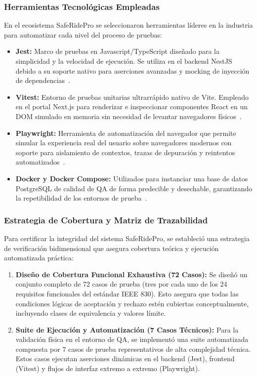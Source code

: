 \documentclass{article}
\begin{document}
\subsubsection*{Herramientas Tecnológicas Empleadas}
En el ecosistema SafeRidePro se seleccionaron herramientas líderes en la industria para automatizar cada nivel del proceso de pruebas:
\begin{itemize}
    \item \textbf{Jest:} Marco de pruebas en Javascript/TypeScript diseñado para la simplicidad y la velocidad de ejecución. Se utiliza en el backend NestJS debido a su soporte nativo para aserciones avanzadas y mocking de inyección de dependencias~\cite{jestdocs}.
    \item \textbf{Vitest:} Entorno de pruebas unitarias ultrarrápido nativo de Vite. Empleado en el portal Next.js para renderizar e inspeccionar componentes React en un DOM simulado en memoria sin necesidad de levantar navegadores físicos~\cite{vitestdocs}.
    \item \textbf{Playwright:} Herramienta de automatización del navegador que permite simular la experiencia real del usuario sobre navegadores modernos con soporte para aislamiento de contextos, trazas de depuración y reintentos automatizados~\cite{playwrightdocs}.
    \item \textbf{Docker y Docker Compose:} Utilizados para instanciar una base de datos PostgreSQL de calidad de QA de forma predecible y desechable, garantizando la repetibilidad de los entornos de prueba~\cite{dockerdocs}.
\end{itemize}

\subsubsection{Estrategia de Cobertura y Matriz de Trazabilidad}

Para certificar la integridad del sistema SafeRidePro, se estableció una estrategia de verificación bidimensional que asegura cobertura teórica y ejecución automatizada práctica:
\begin{enumerate}
    \item \textbf{Diseño de Cobertura Funcional Exhaustiva (72 Casos):} Se diseñó un conjunto completo de 72 casos de prueba (tres por cada uno de los 24 requisitos funcionales del estándar IEEE 830). Esto asegura que todas las condiciones lógicas de aceptación y rechazo estén cubiertas conceptualmente, incluyendo clases de equivalencia y valores límite.
    \item \textbf{Suite de Ejecución y Automatización (7 Casos Técnicos):} Para la validación física en el entorno de QA, se implementó una suite automatizada compuesta por 7 casos de prueba representativos de alta complejidad técnica. Estos casos ejecutan aserciones dinámicas en el backend (Jest), frontend (Vitest) y flujos de interfaz extremo a extremo (Playwright).
\end{enumerate}
\end{document}
